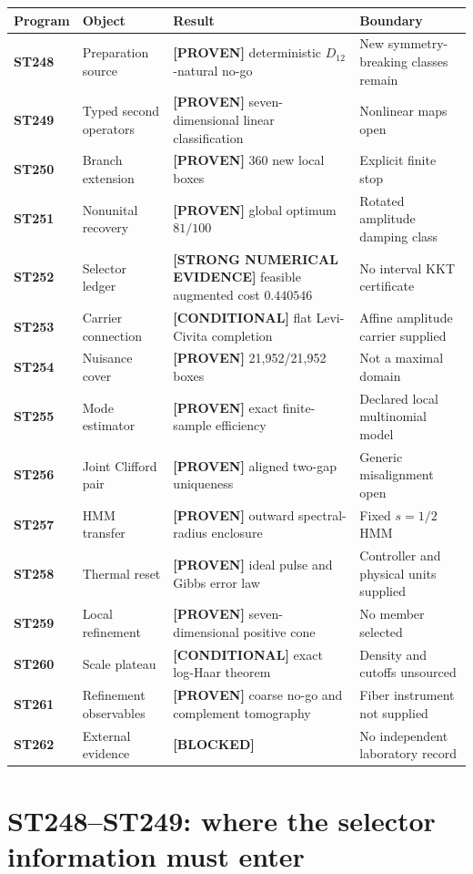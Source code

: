\documentclass[11pt,a4paper]{article}
\newcommand{\Proven}{\textcolor{proved}{\textbf{[PROVEN]}}}
\newcommand{\Evidence}{\textcolor{conditional}{\textbf{[STRONG NUMERICAL EVIDENCE]}}}
\newcommand{\Conditional}{\textcolor{conditional}{\textbf{[CONDITIONAL]}}}
\newcommand{\Blocked}{\textcolor{blocked}{\textbf{[BLOCKED]}}}
\begin{document}
\small
\begin{longtable}{@{}>{\bfseries}p{}p{}p{}p{}@{}}
\toprule
Program & Object & Result & Boundary\\
\midrule
\endhead
ST248 & Preparation source & \Proven{} deterministic $D_{12}$-natural no-go & New symmetry-breaking classes remain\\
ST249 & Typed second operators & \Proven{} seven-dimensional linear classification & Nonlinear maps open\\
ST250 & Branch extension & \Proven{} 360 new local boxes & Explicit finite stop\\
ST251 & Nonunital recovery & \Proven{} global optimum $81/100$ & Rotated amplitude damping class\\
ST252 & Selector ledger & \Evidence{} feasible augmented cost $0.440546$ & No interval KKT certificate\\
ST253 & Carrier connection & \Conditional{} flat Levi-Civita completion & Affine amplitude carrier supplied\\
ST254 & Nuisance cover & \Proven{} 21,952/21,952 boxes & Not a maximal domain\\
ST255 & Mode estimator & \Proven{} exact finite-sample efficiency & Declared local multinomial model\\
ST256 & Joint Clifford pair & \Proven{} aligned two-gap uniqueness & Generic misalignment open\\
ST257 & HMM transfer & \Proven{} outward spectral-radius enclosure & Fixed $s=1/2$ HMM\\
ST258 & Thermal reset & \Proven{} ideal pulse and Gibbs error law & Controller and physical units supplied\\
ST259 & Local refinement & \Proven{} seven-dimensional positive cone & No member selected\\
ST260 & Scale plateau & \Conditional{} exact log-Haar theorem & Density and cutoffs unsourced\\
ST261 & Refinement observables & \Proven{} coarse no-go and complement tomography & Fiber instrument not supplied\\
ST262 & External evidence & \Blocked{} & No independent laboratory record\\
\bottomrule
\end{longtable}
\normalsize

\section{ST248--ST249: where the selector information must enter}
\end{document}
